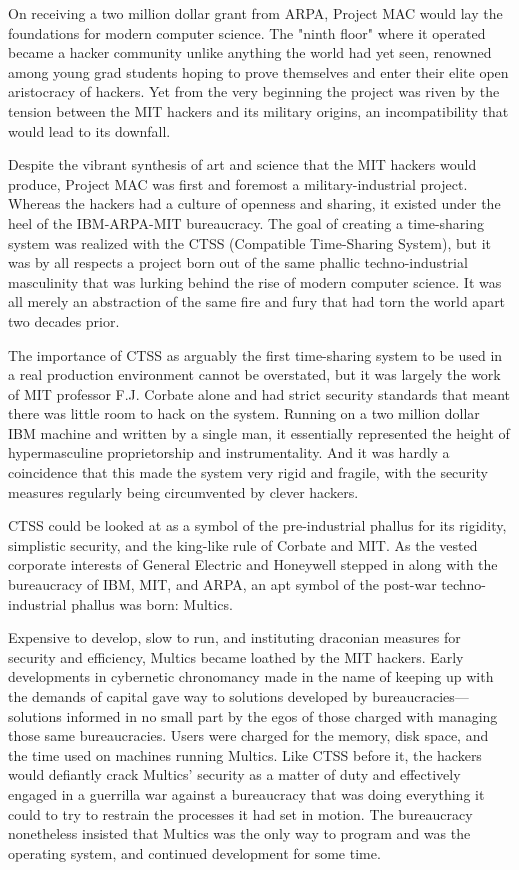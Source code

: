 \documentclass[10pt, statementpaper, twoside, openright]{memoir}
\begin{document}
On receiving a two million dollar grant from ARPA, Project MAC would lay the foundations for modern computer science. The "ninth floor" where it operated became a hacker community unlike anything the world had yet seen, renowned among young grad students hoping to prove themselves and enter their elite open aristocracy of hackers. Yet from the very beginning the project was riven by the tension between the MIT hackers and its military origins, an incompatibility that would lead to its downfall.

Despite the vibrant synthesis of art and science that the MIT hackers would produce, Project MAC was first and foremost a military-industrial project. Whereas the hackers had a culture of openness and sharing, it existed under the heel of the IBM-ARPA-MIT bureaucracy. The goal of creating a time-sharing system was realized with the CTSS (Compatible Time-Sharing System), but it was by all respects a project born out of the same phallic techno-industrial masculinity that was lurking behind the rise of modern computer science. It was all merely an abstraction of the same fire and fury that had torn the world apart two decades prior.

The importance of CTSS as arguably the first time-sharing system to be used in a real production environment cannot be overstated, but it was largely the work of MIT professor F.J. Corbate alone and had strict security standards that meant there was little room to hack on the system. Running on a two million dollar IBM machine and written by a single man, it essentially represented the height of hypermasculine proprietorship and instrumentality. And it was hardly a coincidence that this made the system very rigid and fragile, with the security measures regularly being circumvented by clever hackers.

CTSS could be looked at as a symbol of the pre-industrial phallus for its rigidity, simplistic security, and the king-like rule of Corbate and MIT. As the vested corporate interests of General Electric and Honeywell stepped in along with the bureaucracy of IBM, MIT, and ARPA, an apt symbol of the post-war techno-industrial phallus was born: Multics.

Expensive to develop, slow to run, and instituting draconian measures for security and efficiency, Multics became loathed by the MIT hackers. Early developments in cybernetic chronomancy made in the name of keeping up with the demands of capital gave way to solutions developed by bureaucracies---solutions informed in no small part by the egos of those charged with managing those same bureaucracies. Users were charged for the memory, disk space, and the time used on machines running Multics. Like CTSS before it, the hackers would defiantly crack Multics' security as a matter of duty and effectively engaged in a guerrilla war against a bureaucracy that was doing everything it could to try to restrain the processes it had set in motion. The bureaucracy nonetheless insisted that Multics was the only way to program and was the operating system, and continued development for some time.
\end{document}
